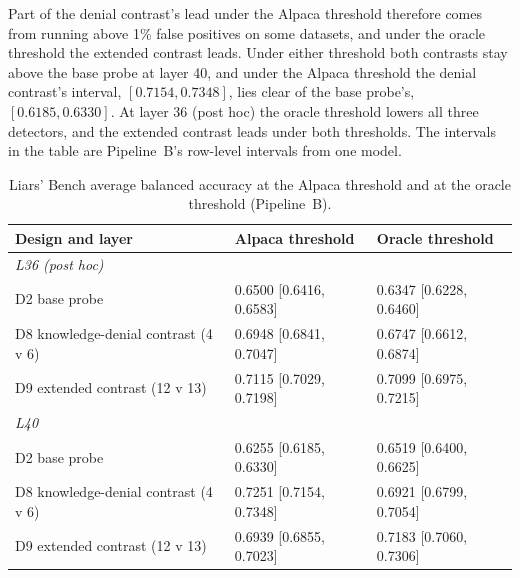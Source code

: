 Part of the denial contrast's lead under the Alpaca threshold therefore comes from running above 1\% false positives on some datasets, and under the oracle threshold the extended contrast leads. %
Under either threshold both contrasts stay above the base probe at layer 40, and under the Alpaca threshold the denial contrast's interval, $[0.7154, 0.7348]$, lies clear of the base probe's, $[0.6185, 0.6330]$. %
At layer 36 (post hoc) the oracle threshold lowers all three detectors, and the extended contrast leads under both thresholds. %
The intervals in the table are Pipeline~B's row-level intervals from one model. %

\begin{table}[t]
\centering
\footnotesize
\caption{Liars' Bench average balanced accuracy at the Alpaca threshold and at the oracle threshold (Pipeline~B).}
\label{tab:r-oracle}
\begin{tabular}{lll}
\hline
Design and layer & Alpaca threshold & Oracle threshold \\
\hline
\multicolumn{3}{l}{\emph{L36 (post hoc)}} \\
D2 base probe & 0.6500 [0.6416, 0.6583] & 0.6347 [0.6228, 0.6460] \\
D8 knowledge-denial contrast (4 v 6) & 0.6948 [0.6841, 0.7047] & 0.6747 [0.6612, 0.6874] \\
D9 extended contrast (12 v 13) & 0.7115 [0.7029, 0.7198] & 0.7099 [0.6975, 0.7215] \\
\multicolumn{3}{l}{\emph{L40}} \\
D2 base probe & 0.6255 [0.6185, 0.6330] & 0.6519 [0.6400, 0.6625] \\
D8 knowledge-denial contrast (4 v 6) & 0.7251 [0.7154, 0.7348] & 0.6921 [0.6799, 0.7054] \\
D9 extended contrast (12 v 13) & 0.6939 [0.6855, 0.7023] & 0.7183 [0.7060, 0.7306] \\
\hline
\end{tabular}
\end{table}

